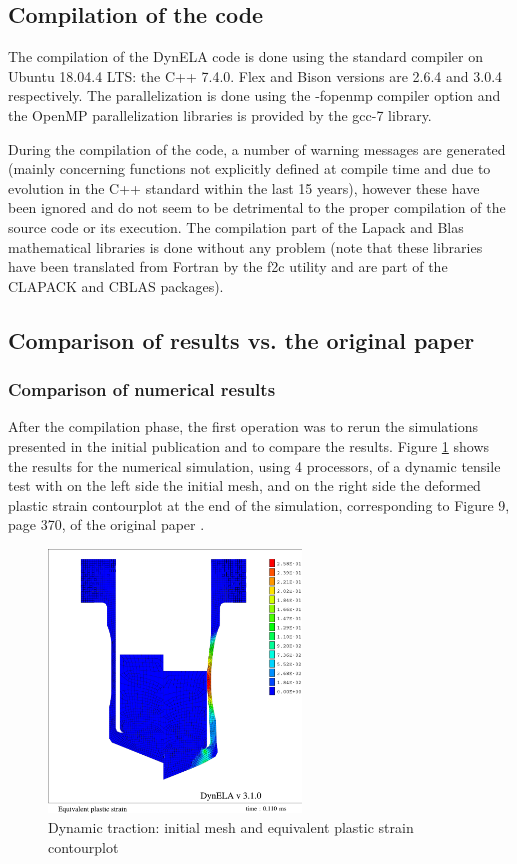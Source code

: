 \subsection{Compilation of the code}

The compilation of the DynELA code is done using the standard compiler on Ubuntu 18.04.4 LTS: the C++ 7.4.0. Flex and Bison versions are 2.6.4 and 3.0.4 respectively. The parallelization is done using the -fopenmp compiler option and the OpenMP parallelization libraries is provided by the gcc-7 library.

During the compilation of the code, a number of warning messages are generated (mainly concerning functions not explicitly defined at compile time and due to evolution in the C++ standard within the last 15 years), however these have been ignored and do not seem to be detrimental to the proper compilation of the source code or its execution. The compilation part of the Lapack and Blas mathematical libraries is done without any problem (note that these libraries have been translated from Fortran by the f2c utility and are part of the CLAPACK and CBLAS packages).

\subsection{Comparison of results vs. the original paper}

\subsubsection{Comparison of numerical results}\label{Ptensile}

After the compilation phase, the first operation was to rerun the simulations presented in the initial publication and to compare the results. Figure \ref{strain} shows the results for the numerical simulation, using 4 processors, of a dynamic tensile test with on the left side the initial mesh, and on the right side the deformed plastic strain contourplot at the end of the simulation, corresponding to Figure 9, page 370, of the original paper \cite{Pantale:2005}.

\begin{figure}[h!] 
  \centering
  \includegraphics[width=0.6\textwidth]{./strain.pdf}
  \caption{Dynamic traction: initial mesh and equivalent plastic strain contourplot}
  \label{strain}
\end{figure}

